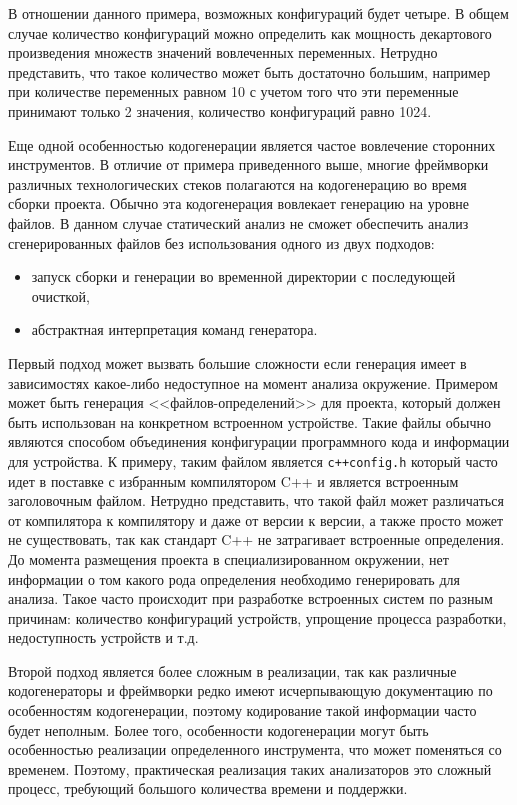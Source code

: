В отношении данного примера, возможных конфигураций будет четыре. В общем случае количество конфигураций
можно определить как мощность декартового произведения множеств значений вовлеченных переменных.
Нетрудно представить, что такое количество может быть достаточно большим, например при количестве переменных
равном 10 с учетом того что эти переменные принимают только 2 значения, количество конфигураций равно 1024.

Еще одной особенностью кодогенерации является частое вовлечение сторонних инструментов. В отличие от
примера приведенного выше, многие фреймворки различных технологических стеков полагаются на кодогенерацию во время
сборки проекта. Обычно эта кодогенерация вовлекает генерацию на уровне файлов. В данном случае статический анализ
не сможет обеспечить анализ сгенерированных файлов без использования одного из двух подходов:
\begin{itemize}
    \item запуск сборки и генерации во временной директории с последующей очисткой,
    \item абстрактная интерпретация команд генератора.
\end{itemize}

Первый подход может вызвать большие сложности если генерация имеет в зависимостях какое-либо
недоступное на момент анализа окружение. Примером может быть генерация <<файлов-определений>> для проекта,
который должен быть использован на конкретном встроенном устройстве. Такие файлы обычно являются
способом объединения конфигурации программного кода и информации для устройства. К примеру, таким файлом
является \texttt{c++config.h} который часто идет в поставке с избранным компилятором C++ и является
встроенным заголовочным файлом. Нетрудно представить, что такой файл может различаться от компилятора к
компилятору и даже от версии к версии, а также просто может не существовать, так как стандарт C++
не затрагивает встроенные определения. 
До момента размещения проекта в специализированном окружении, нет информации 
о том какого рода определения необходимо генерировать для анализа.
Такое часто происходит при разработке встроенных систем по разным причинам: количество конфигураций
устройств, упрощение процесса разработки, недоступность устройств и т.д.

Второй подход является более сложным в реализации, так как различные кодогенераторы и фреймворки редко
имеют исчерпывающую документацию по особенностям кодогенерации, поэтому кодирование такой информации
часто будет неполным. Более того, особенности кодогенерации могут быть особенностью реализации
определенного инструмента, что может поменяться со временем. Поэтому, практическая реализация
таких анализаторов это сложный процесс, требующий большого количества времени и поддержки.


